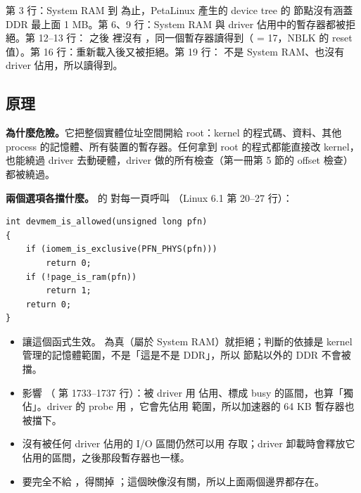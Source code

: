 
第 3 行：System RAM 到  為止，PetaLinux 產生的 device tree 的  節點沒有涵蓋 DDR 最上面 1 MB。第 6、9 行：System RAM 與 driver 佔用中的暫存器都被拒絕。第 12--13 行： 之後  裡沒有 ，同一個暫存器讀得到（ = 17，NBLK 的 reset 值）。第 16 行：重新載入後又被拒絕。第 19 行： 不是 System RAM、也沒有 driver 佔用，所以讀得到。

\subsection{原理}

\textbf{ 為什麼危險。}它把整個實體位址空間開給 root：kernel 的程式碼、資料、其他 process 的記憶體、所有裝置的暫存器。任何拿到 root 的程式都能直接改 kernel，也能繞過 driver 去動硬體，driver 做的所有檢查（第一冊第 5 節的 offset 檢查）都被繞過。

\textbf{兩個選項各擋什麼。} 的  對每一頁呼叫 （Linux 6.1  第 20--27 行）：

\begin{lstlisting}[numbers=none,xleftmargin=0pt,title={\scriptsize lib/devmem\_is\_allowed.c : 20--27（Linux 6.1，節錄）}]
int devmem_is_allowed(unsigned long pfn)
{
	if (iomem_is_exclusive(PFN_PHYS(pfn)))
		return 0;
	if (!page_is_ram(pfn))
		return 1;
	return 0;
}
\end{lstlisting}

\begin{itemize}
\item {} 讓這個函式生效。 為真（屬於 System RAM）就拒絕；判斷的依據是 kernel 管理的記憶體範圍，不是「這是不是 DDR」，所以  節點以外的 DDR 不會被擋。
\item {} 影響 （ 第 1733--1737 行）：被 driver 用  佔用、標成 busy 的區間，也算「獨佔」。driver 的 probe 用 ，它會先佔用  範圍，所以加速器的 64 KB 暫存器也被擋下。
\item 沒有被任何 driver 佔用的 I/O 區間仍然可以用  存取；driver 卸載時會釋放它佔用的區間，之後那段暫存器也一樣。
\item 要完全不給 ，得關掉 ；這個映像沒有關，所以上面兩個邊界都存在。
\end{itemize}

